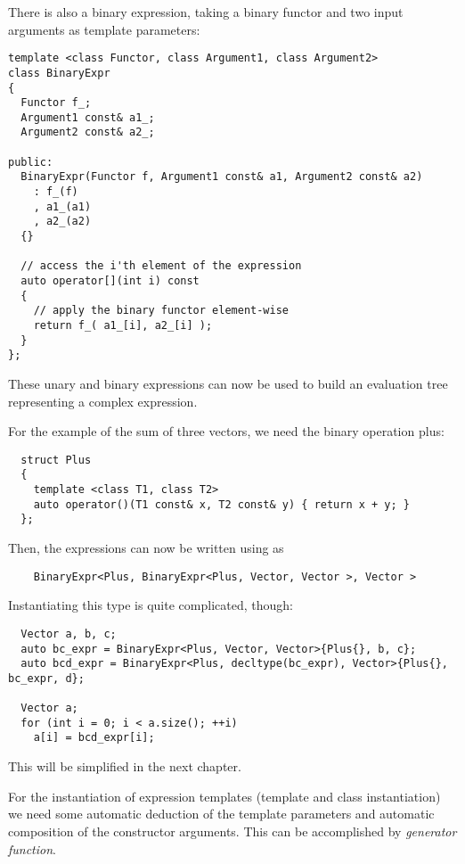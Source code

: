 There is also a binary expression, taking a binary functor and two input arguments as template parameters:
%
\begin{verbatim}
template <class Functor, class Argument1, class Argument2>
class BinaryExpr
{
  Functor f_;
  Argument1 const& a1_;
  Argument2 const& a2_;

public:
  BinaryExpr(Functor f, Argument1 const& a1, Argument2 const& a2)
    : f_(f)
    , a1_(a1)
    , a2_(a2)
  {}

  // access the i'th element of the expression
  auto operator[](int i) const
  {
    // apply the binary functor element-wise
    return f_( a1_[i], a2_[i] );
  }
};
\end{verbatim}


These unary and binary expressions can now be used to build an evaluation tree representing a complex expression.

\begin{example}
  For the example of the sum of three vectors, we need the binary operation plus:
  \begin{verbatim}
  struct Plus
  {
    template <class T1, class T2>
    auto operator()(T1 const& x, T2 const& y) { return x + y; }
  };
  \end{verbatim}

  Then, the expressions  can now be written using  as
  \begin{verbatim}
    BinaryExpr<Plus, BinaryExpr<Plus, Vector, Vector >, Vector >
  \end{verbatim}

  Instantiating this type is quite complicated, though:
  \begin{verbatim}
  Vector a, b, c;
  auto bc_expr = BinaryExpr<Plus, Vector, Vector>{Plus{}, b, c};
  auto bcd_expr = BinaryExpr<Plus, decltype(bc_expr), Vector>{Plus{}, bc_expr, d};

  Vector a;
  for (int i = 0; i < a.size(); ++i)
    a[i] = bcd_expr[i];
  \end{verbatim}
  This will be simplified in the next chapter.
\end{example}

For the instantiation of expression templates (template and class instantiation) we need some automatic deduction of the
template parameters and automatic composition of the constructor arguments. This can be accomplished by \emph{generator function}.


